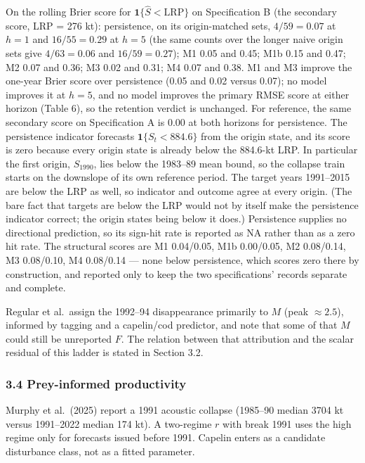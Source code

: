 \documentclass[11pt]{article}
\begin{document}
On the rolling Brier score for \(\mathbf{1}\{\hat S<\mathrm{LRP}\}\) on
Specification B (the secondary score, LRP = 276 kt):
persistence, on its origin-matched sets, \(4/59 = 0.07\) at \(h{=}1\)
and \(16/55 = 0.29\) at \(h{=}5\) (the same counts over the longer naive
origin sets give \(4/63 = 0.06\) and \(16/59 = 0.27\)); M1 0.05 and 0.45;
M1b 0.15 and 0.47; M2 0.07 and 0.36; M3 0.02 and 0.31; M4 0.07 and 0.38.
M1 and M3 improve the one-year Brier score over persistence (0.05 and
0.02 versus 0.07); no model improves it at \(h{=}5\), and no model
improves the primary RMSE score at either horizon (Table 6), so the
retention verdict is unchanged. For reference, the same secondary score on Specification A is 0.00 at
both horizons for persistence. The persistence indicator forecasts
\(\mathbf{1}\{S_t<884.6\}\) from the origin state, and its score is zero
because every origin state is already below the 884.6-kt LRP. In
particular the first origin, \(S_{1990}\), lies below the 1983--89 mean
bound, so the collapse train starts on the downslope of its own
reference period. The target years 1991--2015 are below the LRP as well,
so indicator and outcome agree at every origin. (The bare fact that targets are below the LRP
would not by itself make the persistence indicator correct; the origin
states being below it does.) Persistence supplies no directional prediction, so its sign-hit rate
is reported as NA rather than as a zero hit rate. The structural
scores are M1 0.04/0.05, M1b
0.00/0.05, M2 0.08/0.14, M3 0.08/0.10, M4 0.08/0.14 --- none below
persistence, which scores zero there by construction, and reported only to keep the two specifications' records
separate and complete.

Regular et al.~assign the 1992--94 disappearance primarily to \(M\)
(peak \(\approx 2.5\)), informed by tagging and a capelin/cod predictor,
and note that some of that \(M\) could still be unreported \(F\). The
relation between that attribution and the scalar residual of this ladder
is stated in Section 3.2.

\subsubsection{3.4 Prey-informed
productivity}\label{cod-prey-informed-productivity}

Murphy et al.~(2025) report a 1991 acoustic collapse (1985--90 median
3704 kt versus 1991--2022 median 174 kt). A two-regime \(r\) with break
1991 uses the high regime only for forecasts issued before 1991. Capelin
enters as a candidate disturbance class, not as a fitted parameter.
\end{document}
